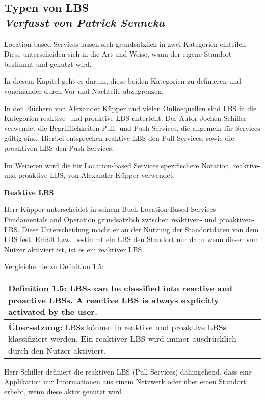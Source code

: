 \newpage
\subsection[Typen von LBS]{Typen von LBS
 \\ \textnormal{\small{\textit {Verfasst von Patrick Senneka}}}}

Location-based Services lassen sich grundsätzlich in zwei Kategorien einteilen. Diese unterscheiden sich in die Art und Weise, wann der eigene Standort bestimmt und genutzt wird. 

In diesem Kapitel geht es darum, diese beiden Kategorien zu definieren und voneinander durch Vor und Nachteile abzugrenzen.

In den Büchern von Alexander Küpper und vielen Onlinequellen sind LBS in die Kategorien reaktive- und proaktive-LBS unterteilt. Der Autor Jochen Schiller verwendet die Begrifflichkeiten Pull- und Push Services, die allgemein für Services gültig sind.
Hierbei entsprechen reaktive LBS den Pull Services, sowie die proaktiven LBS den Push-Services. 

Im Weiteren wird die für Location-based Services spezifischere Notation, reaktive- und proaktive-LBS, von Alexander Küpper verwendet.


\textbf{Reaktive LBS}

Herr Küpper unterscheidet in seinem Buch \glqq Location-Based Services - Fundamentals and Operation \grqq grundsätzlich zwischen reaktiven- und proaktiven-LBS. Diese Unterscheidung macht er an der Nutzung der Standortdaten von dem LBS fest. Erhält bzw. bestimmt ein LBS den Standort nur dann wenn dieser vom Nutzer aktiviert ist, ist es ein reaktiver LBS.

Vergleiche hierzu Definition 1.5:

\begin{table}[h]
	\centering
	\begin{tabular}{|p{16cm}|}\hline
		\textbf{Definition 1.5:} \glqq LBSs can be classified into reactive and proactive LBSs. A reactive LBS is always explicitly activated by the user. \grqq \cite[S.3]{Kuepper2005} \\ \hline
		\textbf{Übersetzung:} LBSs können in reaktive und proaktive LBSs klassifiziert werden. Ein reaktiver LBS wird immer ausdrücklich durch den Nutzer aktiviert.\\ \hline
	\end{tabular}
\end{table}


Herr Schiller definiert die reaktiven LBS (Pull Services) dahingehend, dass eine Applikation nur Informationen aus einem Netzwerk oder über einen Standort erhebt, wenn diese aktiv genutzt wird.


